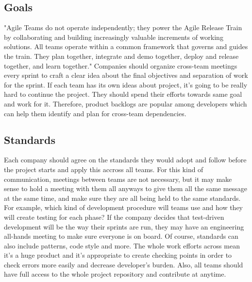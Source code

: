 \documentclass[sigplan,screen]{acmart}
\begin{document}
\subsection{Goals}
"Agile Teams do not operate independently; they power the Agile Release Train by collaborating and building increasingly valuable increments of working solutions. All teams operate within a common framework that governs and guides the train. They plan together, integrate and demo together, deploy and release together, and learn together."\cite{SAFe} Companies should organize cross-team meetings every sprint to craft a clear idea about the final objectives and separation of work for the sprint. If each team has its own ideas about project, it's going to be really hard to continue the project. They should spend their efforts towards same goal and work for it. Therefore, product backlogs are popular among developers which can help them identify and plan for cross-team dependencies.

\subsection{Standards} 
Each company should agree on the standards they would adopt and follow before the project starts and apply this accross all teams. For this kind of communication, meetings between teams are not necessary, but it may make sense to hold a meeting with them all anyways to give them all the same message at the same time, and make sure they are all being held to the same standards. For example, which kind of development procedure will teams use and how they will create testing for each phase? If the company decides that test-driven development will be the way their sprints are run, they may have an engineering all-hands meeting to make sure everyone is on board. Of course, standards can also include patterns, code style and more. The whole work efforts across mean it's a huge product and it's appropriate to create checking points in order to check errors more easily and decrease developer's burden. Also, all teams should have full access to the whole project repository and contribute at anytime.
\end{document}

